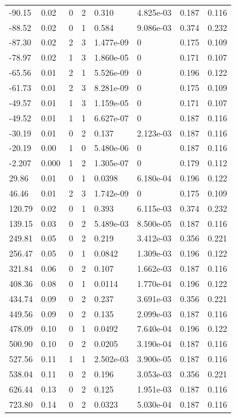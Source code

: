 \documentclass[preview]{standalone}
\begin{document}
{{\begin{tabular}{L{1.2cm}C{1.2cm} C{0.3cm}C{0.5cm} C{1.4cm}C{1.4cm} C{1.4cm}C{1.4cm}}
  -90.15  &  0.02  & 0     &  2 &  0.310  & 4.825e-03  & 0.187 &  0.116   \\ 
  -88.52  &  0.02  & 0     &  1 &  0.584  & 9.086e-03  & 0.374 &  0.232   \\ 
  -87.30  &  0.02  & 2     &  3 &  1.477e-09  & 0  & 0.175 &  0.109   \\ 
  -78.97  &  0.02  & 1     &  3 &  1.860e-05  & 0  & 0.171 &  0.107   \\ 
  -65.56  &  0.01  & 2     &  1 &  5.526e-09  & 0  & 0.196 &  0.122   \\ 
  -61.73  &  0.01  & 2     &  3 &  8.281e-09  & 0  & 0.175 &  0.109   \\ 
  -49.57  &  0.01  & 1     &  3 &  1.159e-05  & 0  & 0.171 &  0.107   \\ 
  -49.52  &  0.01  & 1     &  1 &  6.627e-07  & 0  & 0.187 &  0.116   \\ 
  -30.19  &  0.01  & 0     &  2 &  0.137  & 2.123e-03  & 0.187 &  0.116   \\ 
  -20.19  &  0.00  & 1     &  0 &  5.480e-06  & 0  & 0.187 &  0.116   \\ 
  -2.207  &  0.000  & 1     &  2 &  1.305e-07  & 0  & 0.179 &  0.112   \\ 
  29.86  &  0.01  & 0     &  1 &  0.0398  & 6.180e-04  & 0.196 &  0.122   \\ 
  46.46  &  0.01  & 2     &  3 &  1.742e-09  & 0  & 0.175 &  0.109   \\ 
  120.79  &  0.02  & 0     &  1 &  0.393  & 6.115e-03  & 0.374 &  0.232   \\ 
  139.15  &  0.03  & 0     &  2 &  5.489e-03  & 8.500e-05  & 0.187 &  0.116   \\ 
  249.81  &  0.05  & 0     &  2 &  0.219  & 3.412e-03  & 0.356 &  0.221   \\ 
  256.47  &  0.05  & 0     &  1 &  0.0842  & 1.309e-03  & 0.196 &  0.122   \\ 
  321.84  &  0.06  & 0     &  2 &  0.107  & 1.662e-03  & 0.187 &  0.116   \\ 
  408.36  &  0.08  & 0     &  1 &  0.0114  & 1.770e-04  & 0.196 &  0.122   \\ 
  434.74  &  0.09  & 0     &  2 &  0.237  & 3.691e-03  & 0.356 &  0.221   \\ 
  449.56  &  0.09  & 0     &  2 &  0.135  & 2.099e-03  & 0.187 &  0.116   \\ 
  478.09  &  0.10  & 0     &  1 &  0.0492  & 7.640e-04  & 0.196 &  0.122   \\ 
  500.90  &  0.10  & 0     &  2 &  0.0205  & 3.190e-04  & 0.187 &  0.116   \\ 
  527.56  &  0.11  & 1     &  1 &  2.502e-03  & 3.900e-05  & 0.187 &  0.116   \\ 
  538.04  &  0.11  & 0     &  2 &  0.196  & 3.053e-03  & 0.356 &  0.221   \\ 
  626.44  &  0.13  & 0     &  2 &  0.125  & 1.951e-03  & 0.187 &  0.116   \\ 
  723.80  &  0.14  & 0     &  2 &  0.0323  & 5.030e-04  & 0.187 &  0.116   \\ 
\hline 
\end{tabular} 

}}
\end{document}
